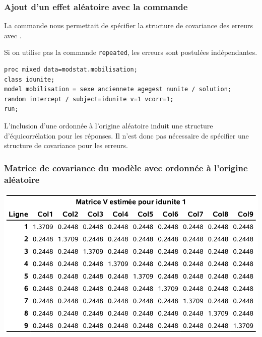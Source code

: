 \documentclass{beamer}
\begin{document}
\begin{frame}[fragile]
\frametitle{Ajout d'un effet aléatoire avec la commande }
\bi
\item La commande  nous permettait de spécifier la structure de covariance des erreurs avec .
\item Si on utilise pas la commande \texttt{repeated}, les erreurs sont postulées indépendantes.
\ei
\begin{tcolorbox}[colback=white, colframe=hecblue, title=Code \SASlang pour ajuster un modèle avec ordonnée à l'origine aléatoire avec erreurs indépendantes]
\begin{footnotesize}
\begin{verbatim}
proc mixed data=modstat.mobilisation;
class idunite;
model mobilisation = sexe anciennete agegest nunite / solution;
random intercept / subject=idunite v=1 vcorr=1;
run;
\end{verbatim}
\end{footnotesize}
\end{tcolorbox}
{\footnotesize L'inclusion d'une ordonnée à l'origine aléatoire \alert{induit} une structure d'équicorrélation pour les réponses. Il n'est donc pas nécessaire de spécifier une structure de covariance pour les erreurs.

}
\end{frame}

\begin{frame}[fragile]
\frametitle{Matrice de covariance du modèle avec ordonnée à l'origine aléatoire}
\begin{center}
\includegraphics[width = 0.9\linewidth]{img/c6/diapos7-e11}

\end{center}
\end{frame}
\end{document}
